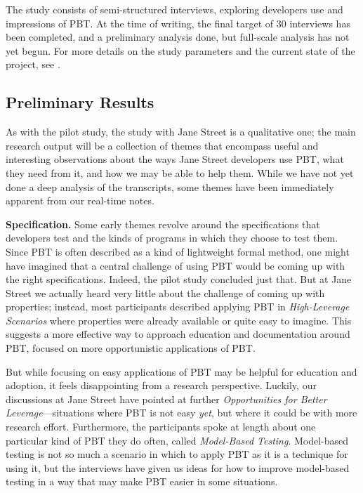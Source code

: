 The study consists of semi-structured interviews, exploring developers use and
impressions of PBT. At the time of writing, the final target of 30 interviews
has been completed, and a preliminary analysis done, but full-scale analysis has
not yet begun. For more details on the study parameters and the current state of
the project, see .

\subsection*{Preliminary Results}
As with the pilot study, the study with Jane Street is a
qualitative one; the main research output will be a collection of themes that
encompass useful and interesting observations about the ways Jane Street
developers use PBT, what they need from it, and how we may be able to help them.
While we have not yet done a deep analysis of the transcripts, some themes have
been immediately apparent from our real-time notes.

\newcommand{\proptheme}[1]{{\color{nord-orange} \em #1}}
\newcommand{\gentheme}[1]{{\color{nord-green} \em #1}}
\newcommand{\evaltheme}[1]{{\color{nord-purple} \em #1}}
{\bf Specification.} Some early themes revolve around the specifications that
developers test and the kinds of programs in which they choose to test them.
Since PBT is often described as a kind of lightweight formal method, one might
have imagined that a central challenge of using PBT would be coming up with the
right specifications. Indeed, the pilot study concluded just
that. But at Jane Street we actually heard very little about the challenge of
coming up with properties; instead, most participants described applying PBT in
\proptheme{High-Leverage Scenarios} where properties were already available or
quite easy to imagine. This suggests a more effective way to approach education
and documentation around PBT, focused on more opportunistic applications of PBT.

But while focusing on easy applications of PBT may be helpful for education and
adoption, it feels disappointing from a research perspective. Luckily, our
discussions at Jane Street have pointed at further \proptheme{Opportunities for
Better Leverage}---situations where PBT is not easy {\em yet}, but where it
could be with more research effort. Furthermore, the participants spoke at
length about one particular kind of PBT they do often, called
\proptheme{Model-Based Testing}. Model-based testing is not so much a scenario in
which to apply PBT as it is a technique for using it, but the interviews have
given us ideas for how to improve model-based testing in a way that may make PBT
easier in some situations.

